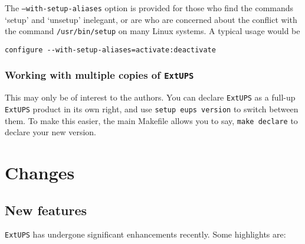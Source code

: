 \documentclass{article}
\newcommand{\code}[1]{\texttt{#1}}
\newcommand{\eups}{\code{ExtUPS}}
\begin{document}
The \code{--with-setup-aliases} option is provided for those who find the commands
`setup' and `unsetup' inelegant, or are who are concerned about the conflict with the
command \code{/usr/bin/setup} on many Linux systems.  A typical usage would be
\begin{verbatim}
configure --with-setup-aliases=activate:deactivate
\end{verbatim}


\subsubsection{Working with multiple copies of \eups}

This may only be of interest to the authors.  You can declare \eups{} as a full-up
\eups{} product in its own right, and use \code{setup eups version} to switch
between them.  To make this easier, the main Makefile allows you to say,
\code{make declare} to declare your new version.

\section{Changes}
\subsection{New features}

\eups{} has undergone significant enhancements recently.  Some
highlights are:
\end{document}
